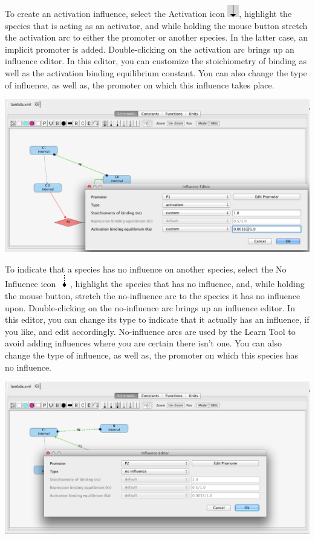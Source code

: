 \documentclass[titlepage,11pt]{article}
\begin{document}
To create an activation influence, select the Activation icon 
\includegraphics{../gui/icons/modelview/activation_selected}, highlight the species that is acting as an activator, and while holding the mouse button stretch the activation arc to either the promoter or another species.  In the latter case, an implicit promoter is added.  Double-clicking on the activation arc brings up an influence editor.  In this editor, you can customize the stoichiometry of binding as well as the activation binding equilibrium constant.  You can also change the type of influence, as well as, the promoter on which this influence takes place.  

\begin{center}
\includegraphics[width=160mm]{screenshots/activation}
\end{center}

To indicate that a species has no influence on another species, select the No Influence icon 
\includegraphics{../gui/icons/modelview/no_influence}, highlight the species that has no influence, and, while holding the mouse button, stretch the no-influence arc to the species it has no influence upon.  Double-clicking on the no-influence arc brings up an influence editor.  In this editor, you can change its type to indicate that it actually has an influence, if you like, and edit accordingly.  No-influence arcs are used by the Learn Tool to avoid adding influences where you are certain there isn't one.  You can also change the type of influence, as well as, the promoter on which this species has no influence.  

\begin{center}
\includegraphics[width=160mm]{screenshots/noInfluence}
\end{center}
\end{document}
